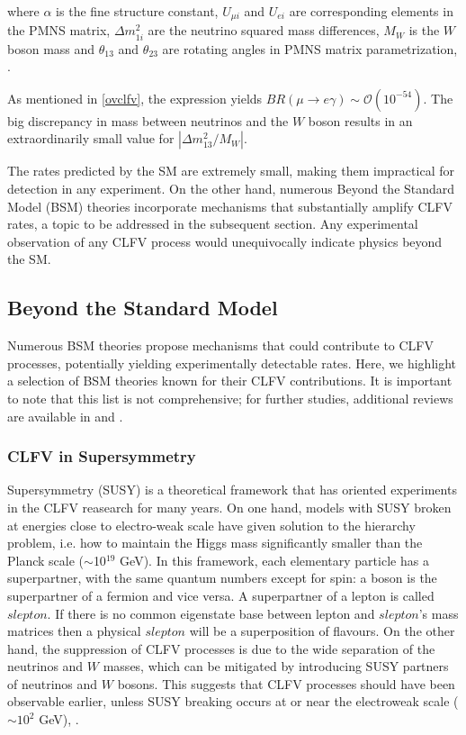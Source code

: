 where $\alpha$ is the fine structure constant, $U_{\mu i}$ and $U_{ei}$ are 
corresponding elements in the PMNS matrix, $\Delta m_{1i}^2$ are the neutrino 
squared mass differences, $M_W$ is the $W$ boson mass and $\theta_{13}$ and 
$\theta_{23}$ are rotating angles in PMNS matrix parametrization, \cite{MARCIANO1977303}.

As mentioned in \ref{ovclfv}, the expression yields $B R(\mu \rightarrow e \gamma) \sim \mathcal{O}(10^{-54})$. 
The big discrepancy in mass between neutrinos and the $W$ boson results in an 
extraordinarily small value for $|\Delta m_{13}^2/M_W|$.


The rates predicted by the SM are extremely small, 
making them impractical for detection in any experiment. On the 
other hand, numerous Beyond the Standard Model (BSM) theories 
incorporate mechanisms that substantially amplify CLFV rates, a 
topic to be addressed in the subsequent section. Any experimental observation of 
any CLFV process would unequivocally indicate physics beyond the SM.

\subsection{Beyond the Standard Model}
Numerous BSM theories propose mechanisms that could contribute to 
CLFV processes, potentially yielding experimentally detectable rates. 
Here, we highlight a selection of BSM theories known for their CLFV 
contributions. It is important to note that this list is not 
comprehensive; for further studies, additional reviews are available 
in \cite{clfv_signorelli} and \cite{universe8060299}.
\subsubsection{CLFV in Supersymmetry}\label{susy}
Supersymmetry (SUSY) is a theoretical framework that has oriented 
experiments in the CLFV reasearch for many years. On one hand, 
models with SUSY broken at energies close to electro-weak scale 
have given solution to the hierarchy problem, i.e. how to maintain 
the Higgs mass significantly smaller than the Planck scale ($\sim$10$^{19}$ GeV). 
In this framework, each elementary particle has a superpartner, 
with the same quantum numbers except for spin: a boson is the superpartner 
of a fermion and vice versa. A superpartner of a lepton is called $slepton$. 
If there is no common eigenstate base between lepton and $slepton$'s mass 
matrices then a physical $slepton$ will be a superposition of flavours.
On the other hand, the suppression of CLFV processes is due to the wide 
separation of the neutrinos and $W$ masses, which can be mitigated by 
introducing SUSY partners of neutrinos and $W$ bosons. This suggests 
that CLFV processes should have been observable earlier, unless SUSY 
breaking occurs at or near the electroweak scale ($\sim 10^2$ GeV), \cite{clfv_signorelli}.

